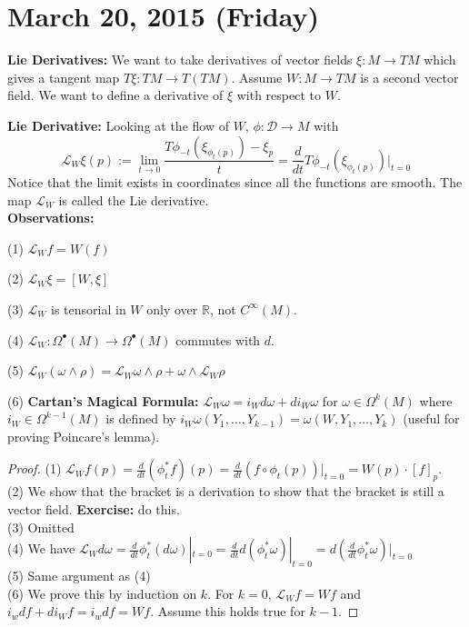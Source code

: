 \documentclass{article}
\newcommand\Lie{\mathcal{L}}
\begin{document}
\section{March 20, 2015 (Friday)}
\textbf{Lie Derivatives:} We want to take derivatives of vector fields $\xi: M \to TM$ which gives a tangent map $T\xi: TM \to T(TM)$. Assume $W: M \to TM$ is a second vector field. We want to define a derivative of $\xi$ with respect to $W$.

\textbf{Lie Derivative:} Looking at the flow of $W$, $\phi:\mathcal{D} \to M$ with
\[
\Lie_W \xi(p) := \lim_{t \to 0} \frac{T\phi_{-t}(\xi_{\phi_t(p)}) - \xi_p}{t} = \frac{d}{dt}T\phi_{-t}(\xi_{\phi_t(p)})|_{t=0}
\]
Notice that the limit exists in coordinates since all the functions are smooth. The map $\Lie_W$ is called the Lie derivative.\\
\textbf{Observations:}

(1) $\Lie_W f = W(f)$

(2) $\Lie_W \xi = [W, \xi]$

(3) $\Lie_W$ is tensorial in $W$ only over $\mathbb{R}$, not $C^{\infty}(M)$.

(4) $\Lie_W: \Omega^\bullet(M) \to \Omega^\bullet(M)$ commutes with $d$.

(5) $\Lie_W(\omega \wedge \rho) = \Lie_W\omega \wedge \rho + \omega \wedge \Lie_W \rho$

(6) \textbf{Cartan's Magical Formula:} $\Lie_W\omega = i_Wd\omega + di_W \omega$ for $\omega \in \Omega^k(M)$ where $i_W \in \Omega^{k-1}(M)$ is defined by $i_W\omega(Y_1, \ldots, Y_{k-1}) = \omega(W, Y_1, \ldots, Y_k)$ (useful for proving Poincare's lemma).
\begin{proof}
(1) $\Lie_Wf(p) = \frac{d}{dt}(\phi_t^*f)(p) = \frac{d}{dt}(f \circ \phi_t(p))|_{t = 0} = W(p)\cdot [f]_p$. \\
(2) We show that the bracket is a derivation to show that the bracket is still a vector field. \textbf{Exercise:} do this. \\
(3) Omitted \\
(4) We have $\Lie_W d \omega = \frac{d}{dt}\phi_t^*(d \omega) |_{t=0} = \frac{d}{dt}d(\phi_t^* \omega)|_{t=0} = d(\frac{d}{dt} \phi_t^*\omega)|_{t=0}$ \\
(5) Same argument as (4) \\
(6) We prove this by induction on $k$. For $k = 0$, $\Lie_Wf = Wf$ and $i_w df + di_Wf = i_wdf = Wf$. Assume this holds true for $k-1$.
\end{proof}
\end{document}
